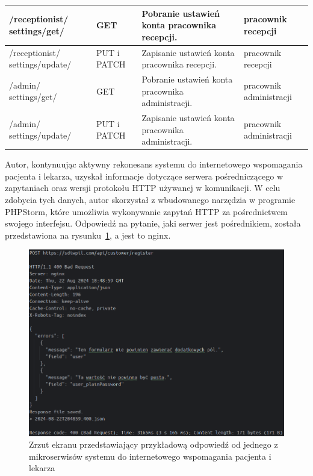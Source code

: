 \documentclass[12pt,twoside]{book}
\newcommand{\captionvspace}{\vspace{6pt}}
\begin{document}
\begin{longtable}{|>{\raggedright\arraybackslash}p{3cm}|>{\raggedright\arraybackslash}p{2cm}|>{\raggedright\arraybackslash}p{5cm}|>{\raggedright\arraybackslash}p{3.5cm}|}
        /receptionist/ settings/get/    & GET                            & Pobranie ustawień konta pracownika recepcji.                                   & pracownik recepcji                                           \\ \hline
        /receptionist/ settings/update/ & PUT i PATCH                    & Zapisanie ustawień konta pracownika recepcji. & pracownik recepcji \\ \hline
        /admin/ settings/get/           & GET                            & Pobranie ustawień konta pracownika administracji.                              & pracownik administracji                                      \\ \hline
        /admin/ settings/update/        & PUT i PATCH                    & Zapisanie ustawień konta pracownika administracji. & pracownik administracji \\ \hline

    \end{longtable}

    Autor, kontynuując aktywny rekonesans systemu do internetowego wspomagania pacjenta i lekarza, uzyskał informacje dotyczące serwera pośredniczącego w zapytaniach oraz wersji protokołu HTTP używanej w komunikacji. W celu zdobycia tych danych, autor skorzystał z wbudowanego narzędzia w programie PHPStorm, które umożliwia wykonywanie zapytań HTTP za pośrednictwem swojego interfejsu. Odpowiedź na pytanie, jaki serwer jest pośrednikiem, została przedstawiona na rysunku~\ref{fig:sdiwpil-response}, a jest to nginx.

    \begin{figure}[ht]
        \centering
        \includegraphics[width=\textwidth]{includes/images/example-response-from-sdiwpil.png}
        \captionvspace
        \caption{Zrzut ekranu przedstawiający przykładową odpowiedź od jednego z mikroserwisów systemu do internetowego wspomagania pacjenta i lekarza}
        \label{fig:sdiwpil-response}
    \end{figure}
\end{document}
